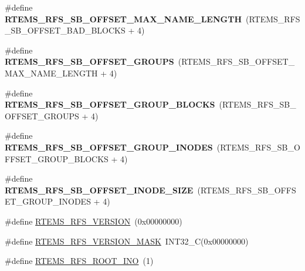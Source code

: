 \begin{DoxyCompactItemize}
\#define {\bfseries R\+T\+E\+M\+S\+\_\+\+R\+F\+S\+\_\+\+S\+B\+\_\+\+O\+F\+F\+S\+E\+T\+\_\+\+M\+A\+X\+\_\+\+N\+A\+M\+E\+\_\+\+L\+E\+N\+G\+TH}~(R\+T\+E\+M\+S\+\_\+\+R\+F\+S\+\_\+\+S\+B\+\_\+\+O\+F\+F\+S\+E\+T\+\_\+\+B\+A\+D\+\_\+\+B\+L\+O\+C\+KS      + 4)
\item 
\mbox{\label{rtems-rfs-file-system_8h_a940e577e9d87f0834306e8b54c2f0fa4}} 
\#define {\bfseries R\+T\+E\+M\+S\+\_\+\+R\+F\+S\+\_\+\+S\+B\+\_\+\+O\+F\+F\+S\+E\+T\+\_\+\+G\+R\+O\+U\+PS}~(R\+T\+E\+M\+S\+\_\+\+R\+F\+S\+\_\+\+S\+B\+\_\+\+O\+F\+F\+S\+E\+T\+\_\+\+M\+A\+X\+\_\+\+N\+A\+M\+E\+\_\+\+L\+E\+N\+G\+TH + 4)
\item 
\mbox{\label{rtems-rfs-file-system_8h_adf10cf6062832dba08dc389accabe8f7}} 
\#define {\bfseries R\+T\+E\+M\+S\+\_\+\+R\+F\+S\+\_\+\+S\+B\+\_\+\+O\+F\+F\+S\+E\+T\+\_\+\+G\+R\+O\+U\+P\+\_\+\+B\+L\+O\+C\+KS}~(R\+T\+E\+M\+S\+\_\+\+R\+F\+S\+\_\+\+S\+B\+\_\+\+O\+F\+F\+S\+E\+T\+\_\+\+G\+R\+O\+U\+PS          + 4)
\item 
\mbox{\label{rtems-rfs-file-system_8h_a8069c056c6d70c85213f3457e716f0a4}} 
\#define {\bfseries R\+T\+E\+M\+S\+\_\+\+R\+F\+S\+\_\+\+S\+B\+\_\+\+O\+F\+F\+S\+E\+T\+\_\+\+G\+R\+O\+U\+P\+\_\+\+I\+N\+O\+D\+ES}~(R\+T\+E\+M\+S\+\_\+\+R\+F\+S\+\_\+\+S\+B\+\_\+\+O\+F\+F\+S\+E\+T\+\_\+\+G\+R\+O\+U\+P\+\_\+\+B\+L\+O\+C\+KS    + 4)
\item 
\mbox{\label{rtems-rfs-file-system_8h_a2957ee65ff273cd73d890247c34fbf2e}} 
\#define {\bfseries R\+T\+E\+M\+S\+\_\+\+R\+F\+S\+\_\+\+S\+B\+\_\+\+O\+F\+F\+S\+E\+T\+\_\+\+I\+N\+O\+D\+E\+\_\+\+S\+I\+ZE}~(R\+T\+E\+M\+S\+\_\+\+R\+F\+S\+\_\+\+S\+B\+\_\+\+O\+F\+F\+S\+E\+T\+\_\+\+G\+R\+O\+U\+P\+\_\+\+I\+N\+O\+D\+ES    + 4)
\item 
\#define \mbox{\hyperlink{rtems-rfs-file-system_8h_a84b3697a818e0e6ef6d836ccf00c3506}{R\+T\+E\+M\+S\+\_\+\+R\+F\+S\+\_\+\+V\+E\+R\+S\+I\+ON}}~(0x00000000)
\item 
\#define \mbox{\hyperlink{rtems-rfs-file-system_8h_a97ff181882ac58f8186a10a69d4c7213}{R\+T\+E\+M\+S\+\_\+\+R\+F\+S\+\_\+\+V\+E\+R\+S\+I\+O\+N\+\_\+\+M\+A\+SK}}~I\+N\+T32\+\_\+C(0x00000000)
\item 
\#define \mbox{\hyperlink{rtems-rfs-file-system_8h_a341dd2280c086baadd35b5e4471ff416}{R\+T\+E\+M\+S\+\_\+\+R\+F\+S\+\_\+\+R\+O\+O\+T\+\_\+\+I\+NO}}~(1)

\end{DoxyCompactItemize}
